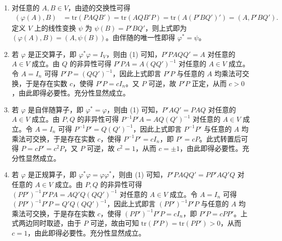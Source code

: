 \documentclass[../../main.tex]{subfiles}
\begin{document}
\begin{solution}
\begin{enumerate}[(1)]
\item 对任意的 \(A,B\in V\)，由迹的交换性可得
\begin{align*}
(\varphi(A),B)&=\mathrm{tr}(PAQB')=\mathrm{tr}(AQB'P)=\mathrm{tr}(A(P'BQ')')=(A,P'BQ').
\end{align*}
定义 \(V\) 上的线性变换 \(\psi\) 为 \(\psi(B)=P'BQ'\)，则上式即为 \((\varphi(A),B)=(A,\psi(B))\)。由伴随的唯一性即得 \(\varphi^* = \psi\)。
\item 若 \(\varphi\) 是正交算子，即 \(\varphi^*\varphi = I_V\)，则由 (1) 可知，\(P'PAQQ' = A\) 对任意的 \(A\in V\) 成立。由 \(Q\) 的非异性可得 \(P'PA = A(QQ')^{-1}\) 对任意的 \(A\in V\) 成立。令 \(A = I_n\) 可得 \(P'P=(QQ')^{-1}\)，因此上式即言 \(P'P\) 与任意的 \(A\) 均乘法可交换，于是存在实数 \(c\)，使得 \(P'P = cI_n\)。又 \(P\) 可逆，故 \(P'P\) 正定，从而 \(c > 0\)，由此即得必要性。充分性显然成立。
\item 若 \(\varphi\) 是自伴随算子，即 \(\varphi^* = \varphi\)，则由 (1) 可知，\(P'AQ' = PAQ\) 对任意的 \(A\in V\) 成立。由 \(P,Q\) 的非异性可得 \(P^{-1}P'A = AQ(Q')^{-1}\) 对任意的 \(A\in V\) 成立。令 \(A = I_n\) 可得 \(P^{-1}P' = Q(Q')^{-1}\)，因此上式即言 \(P^{-1}P'\) 与任意的 \(A\) 均乘法可交换，于是存在实数 \(c\)，使得 \(P^{-1}P' = cI_n\)，即 \(P' = cP\)。此式转置后可得 \(P = cP' = c^2P\)，又 \(P\) 可逆，故 \(c^2 = 1\)，从而 \(c = \pm1\)，由此即得必要性。充分性显然成立。 
\item 若 \(\varphi\) 是正规算子，即 \(\varphi^*\varphi = \varphi\varphi^*\)，则由 (1) 可知，\(P'PAQQ' = PP'AQ'Q\) 对任意的 \(A\in V\) 成立。由 \(P,Q\) 的非异性可得 \((PP')^{-1}P'PA = AQ'Q(QQ')^{-1}\) 对任意的 \(A\in V\) 成立。令 \(A = I_n\) 可得 \((PP')^{-1}P'P = Q'Q(QQ')^{-1}\)，因此上式即言 \((PP')^{-1}P'P\) 与任意的 \(A\) 均乘法可交换，于是存在实数 \(c\)，使得 \((PP')^{-1}P'P = cI_n\)，即 \(P'P = cPP'\)。上式两边同时取迹，由于 \(P\) 可逆，故由可知 \(\mathrm{tr}(P'P)=\mathrm{tr}(PP') > 0\)，从而 \(c = 1\)，由此即得必要性。充分性显然成立。 
\end{enumerate} 

\end{solution}
\end{document}
